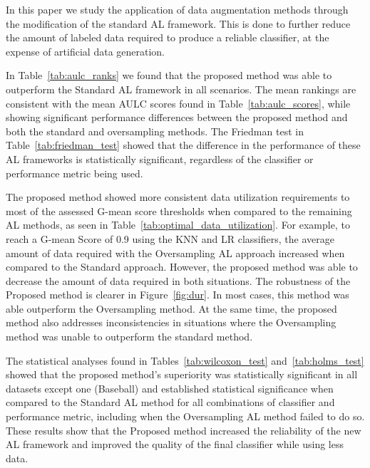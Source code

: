 \documentclass[parskip=full]{scrartcl}
\begin{document}
In this paper we study the application of data augmentation methods through
the modification of the standard AL framework. This is done to further reduce
the amount of labeled data required to produce a reliable classifier, at the
expense of artificial data generation.

In Table~\ref{tab:aulc_ranks} we found that the proposed method was able to
outperform the Standard AL framework in all scenarios. The mean rankings are
consistent with the mean AULC scores found in Table~\ref{tab:aulc_scores},
while showing significant performance differences between the proposed method
and both the standard and oversampling methods. The Friedman test in
Table~\ref{tab:friedman_test} showed that the difference in the performance of
these AL frameworks is statistically significant, regardless of the
classifier or performance metric being used.

The proposed method showed more consistent data utilization requirements to
most of the assessed G-mean score thresholds when compared to the remaining AL
methods, as seen in Table~\ref{tab:optimal_data_utilization}. For example, to
reach a G-mean Score of 0.9 using the KNN and LR classifiers, the average
amount of data required with the Oversampling AL approach increased when
compared to the Standard approach. However, the proposed method was able to
decrease the amount of data required in both situations. The robustness of the
Proposed method is clearer in Figure~\ref{fig:dur}. In most cases, this method
was able outperform the Oversampling method. At the same time, the
proposed method also addresses inconsistencies in situations where the
Oversampling method was unable to outperform the standard method.

The statistical analyses found in Tables~\ref{tab:wilcoxon_test}
and~\ref{tab:holms_test} showed that the proposed method's superiority was
statistically significant in all datasets except one (Baseball) and
established statistical significance when compared to the Standard AL method
for all combinations of classifier and performance metric, including when the
Oversampling AL method failed to do so. These results show that the Proposed
method increased the reliability of the new AL framework and improved the
quality of the final classifier while using less data.
\end{document}
